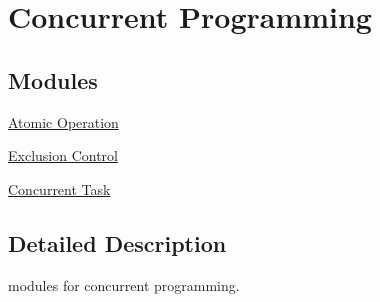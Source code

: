 \hypertarget{group__concurrent__programming}{\section{Concurrent Programming}
\label{group__concurrent__programming}
}
\subsection*{Modules}
\begin{DoxyCompactItemize}
\item 
\hyperlink{group__atomic__operation}{Atomic Operation}
\item 
\hyperlink{group__exclusion__control}{Exclusion Control}
\item 
\hyperlink{group__task}{Concurrent Task}
\end{DoxyCompactItemize}


\subsection{Detailed Description}
modules for concurrent programming. 